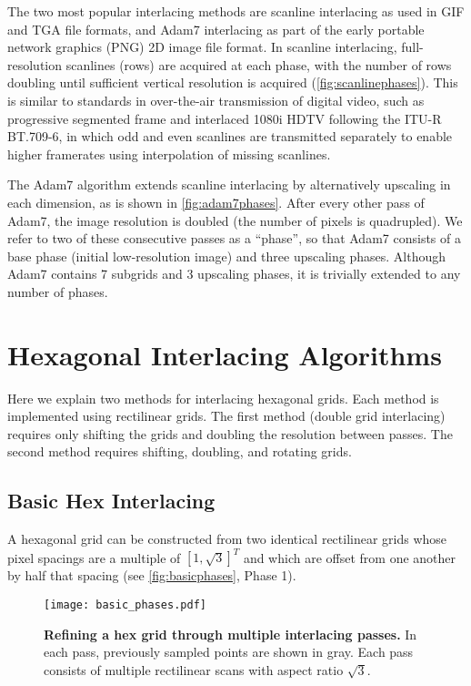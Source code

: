 \documentclass[aip, amsmath, amssymb, nobibnotes, nofootinbib, citeautoscript, reprint, superscriptaddress]{revtex4-2}
\begin{document}
    The two most popular interlacing methods are scanline interlacing as used in GIF and TGA file formats, and Adam7 interlacing as part of the early portable network graphics (PNG) 2D image file format\cite{png}.
    In scanline interlacing, full-resolution scanlines (rows) are acquired at each phase, with the number of rows doubling until sufficient vertical resolution is acquired (\autoref{fig:scanlinephases}).
    This is similar to standards in over-the-air transmission of digital video, such as progressive segmented frame and interlaced 1080i HDTV following the ITU-R BT.709-6\cite{hdtv}, in which odd and even scanlines are transmitted separately to enable higher framerates using interpolation of missing scanlines.

    The Adam7 algorithm extends scanline interlacing by alternatively upscaling in each dimension, as is shown in \autoref{fig:adam7phases}.
    After every other pass of Adam7, the image resolution is doubled (the number of pixels is quadrupled).
    We refer to two of these consecutive passes as a ``phase'', so that Adam7 consists of a base phase (initial low-resolution image) and three upscaling phases.
    Although Adam7 contains 7 subgrids and 3 upscaling phases, it is trivially extended to any number of phases.

    \section{Hexagonal Interlacing Algorithms}
    \label{sec:hexinter}

    Here we explain two methods for interlacing hexagonal grids.
    Each method is implemented using rectilinear grids.
    The first method (double grid interlacing) requires only shifting the grids and doubling the resolution between passes.
    The second method requires shifting, doubling, and rotating grids.


    \subsection{\label{ssec:double-grid-interlacing}Basic Hex Interlacing}

    A hexagonal grid can be constructed from two identical rectilinear grids whose pixel spacings are a multiple of $\left[1, \sqrt{3}\right]^T$ and which are offset from one another by half that spacing (see \autoref{fig:basicphases}, Phase 1).

    \begin{figure*}
        \texttt{[image: basic\_phases.pdf]}
        \caption{
            \label{fig:basicphases} 
            \textbf{Refining a hex grid through multiple interlacing passes.}
            In each pass, previously sampled points are shown in gray.
            Each pass consists of multiple rectilinear scans with aspect ratio $\sqrt{3}$.
            }
    \end{figure*}
\end{document}

